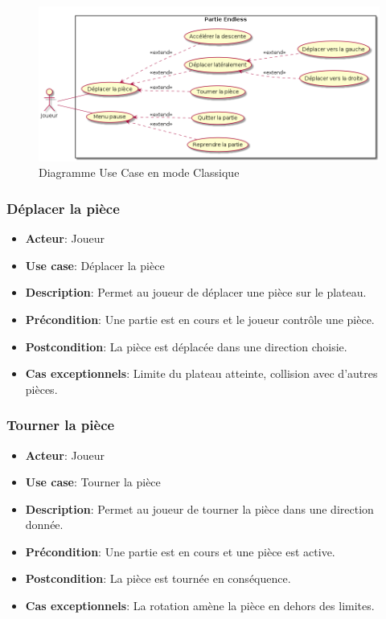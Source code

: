 \documentclass{article}
\begin{document}
\begin{figure}[!h]
    \centering
    \includegraphics[width=1\textwidth]{uml/usescase/en-jeu/endless.png}
    \caption{Diagramme Use Case en mode Classique}
    \label{fig:Classique}
\end{figure}

\subsubsection*{Déplacer la pièce}
\begin{itemize}
    \item \textbf{Acteur}: Joueur
    \item \textbf{Use case}: Déplacer la pièce
    \item \textbf{Description}: Permet au joueur de déplacer une pièce sur le plateau.
    \item \textbf{Précondition}: Une partie est en cours et le joueur contrôle une pièce.
    \item \textbf{Postcondition}: La pièce est déplacée dans une direction choisie.
    \item \textbf{Cas exceptionnels}: Limite du plateau atteinte, collision avec d'autres pièces.
\end{itemize}

\subsubsection*{Tourner la pièce}
\begin{itemize}
    \item \textbf{Acteur}: Joueur
    \item \textbf{Use case}: Tourner la pièce
    \item \textbf{Description}: Permet au joueur de tourner la pièce dans une direction donnée.
    \item \textbf{Précondition}: Une partie est en cours et une pièce est active.
    \item \textbf{Postcondition}: La pièce est tournée en conséquence.
    \item \textbf{Cas exceptionnels}: La rotation amène la pièce en dehors des limites.
\end{itemize}
\end{document}
